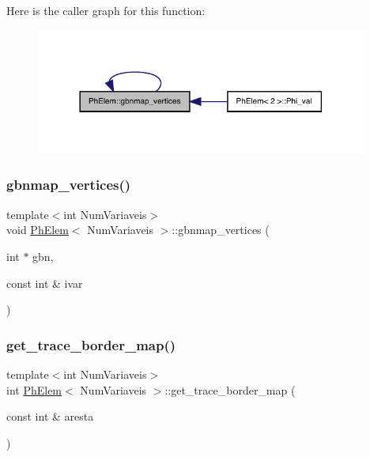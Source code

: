 Here is the caller graph for this function\+:
\nopagebreak
\begin{figure}[H]
\begin{center}
\leavevmode
\includegraphics[width=309pt]{classPhElem_ad8d5bac3d1866cfe20daec73fc405b05_icgraph}
\end{center}
\end{figure}
\mbox{\label{classPhElem_a75f80b321d33ea208ae2d35af1b8c4df}} 
\subsubsection{\texorpdfstring{gbnmap\+\_\+vertices()}{gbnmap\_vertices()}\hspace{0.1cm}{\footnotesize\ttfamily [2/2]}}
{\footnotesize\ttfamily template$<$int Num\+Variaveis$>$ \\
void \hyperlink{classPhElem}{Ph\+Elem}$<$ Num\+Variaveis $>$\+::gbnmap\+\_\+vertices (\begin{DoxyParamCaption}\item[{int $\ast$}]{gbn,  }\item[{const int \&}]{ivar }\end{DoxyParamCaption})}

\mbox{\label{classPhElem_a35508e257e1675a912954f83cb4b6a3e}} 
\subsubsection{\texorpdfstring{get\+\_\+trace\+\_\+border\+\_\+map()}{get\_trace\_border\_map()}}
{\footnotesize\ttfamily template$<$int Num\+Variaveis$>$ \\
int \hyperlink{classPhElem}{Ph\+Elem}$<$ Num\+Variaveis $>$\+::get\+\_\+trace\+\_\+border\+\_\+map (\begin{DoxyParamCaption}\item[{const int \&}]{aresta }\end{DoxyParamCaption})}



